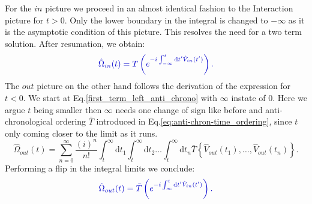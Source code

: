 \documentclass[12pt, titlepage]{article}
\begin{document}
For the $ in $ picture we proceed in an almost identical fashion to the Interaction picture for $ t > 0 $. Only the lower boundary in the integral is changed to $ -\infty $ as it is the asymptotic condition of this picture. This resolves the need for a two term solution. 
After resumation, we obtain:
\begin{equation}\label{eq:Omega_in_converg}
\textcolor[RGB]{0,0,204}{
\hat{\Omega}_{in}(t)
= T\left( e^{-i\int_{-\infty}^{t}\mathrm{d}t^{\prime} \hat{V}_{in}(t^{\prime})} \right)
	.}
\end{equation}
The $ out $ picture on the other hand follows the derivation of the expression for $ t < 0 $. We start at Eq.\enskip\eqref{first_term_left_anti_chrono} with $ \infty $ instate of $ 0 $. Here we argue $ t $ being smaller then $ \infty $ needs one change of sign like before and anti-chronological ordering $ \bar{T} $ introduced in Eq.\enskip\eqref{eq:anti-chron-time_ordering}, since $ t $ only coming closer to the limit as it runs.
\begin{equation}
\hat{\Omega}_{out}(t) =
\sum\limits_{n=0}^{\infty} 
\frac{(i)^{n}}{n!}
\int^{\infty}_{t}\mathrm{d}t_1\int^{\infty}_{t}\! \! \mathrm{d}t_2
 \ldots
 \int^{\infty}_{t}\! \! \mathrm{d}t_n
 \bar{T}\left\lbrace \hat{V}_{out}(t_1), \ldots , \hat{V}_{out}(t_n)\right\rbrace .
\end{equation}
Performing a flip in the integral limits we conclude:
\begin{equation}\label{eq:Omega_out_converg}
\textcolor[RGB]{0,0,204}{
\hat{\Omega}_{out}(t)
= \bar{T}\left( e^{-i\int_{\infty}^{t}\mathrm{d}t^{\prime} \hat{V}_{in}(t^{\prime})} \right)
	.}
\end{equation}
\end{document}
